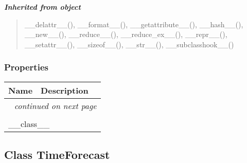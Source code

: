 \large{\textbf{\textit{Inherited from object}}}

\begin{quote}
\_\_delattr\_\_(), \_\_format\_\_(), \_\_getattribute\_\_(), \_\_hash\_\_(), \_\_new\_\_(), \_\_reduce\_\_(), \_\_reduce\_ex\_\_(), \_\_repr\_\_(), \_\_setattr\_\_(), \_\_sizeof\_\_(), \_\_str\_\_(), \_\_subclasshook\_\_()
\end{quote}


  \subsubsection{Properties}

    \vspace{-1cm}
\hspace{\varindent}\begin{longtable}{|p{\varnamewidth}|p{\vardescrwidth}|l}
\cline{1-2}
\cline{1-2} \centering \textbf{Name} & \centering \textbf{Description}& \\
\cline{1-2}
\endhead\cline{1-2}\multicolumn{3}{r}{\small\textit{continued on next page}}\\\endfoot\cline{1-2}
\endlastfoot\multicolumn{2}{|l|}{\textit{Inherited from object}}\\
\multicolumn{2}{|p{\varwidth}|}{\raggedright \_\_class\_\_}\\
\cline{1-2}
\end{longtable}



\subsection{Class TimeForecast}

